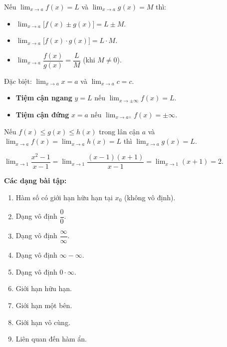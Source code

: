 \documentclass[12pt,a4paper]{article}
\begin{document}
\begin{tinhchat}[title={Quy tắc tính}]
  Nếu $\displaystyle\lim_{x \to a} f(x) = L$ và $\displaystyle\lim_{x \to a} g(x) = M$ thì:
  \begin{itemize}
    \item $\displaystyle\lim_{x \to a}\bigl[f(x) \pm g(x)\bigr] = L \pm M$.
    \item $\displaystyle\lim_{x \to a}\bigl[f(x) \cdot g(x)\bigr] = L \cdot M$.
    \item $\displaystyle\lim_{x \to a}\dfrac{f(x)}{g(x)} = \dfrac{L}{M}$ \;(khi $M \ne 0$).
  \end{itemize}
  Đặc biệt: $\displaystyle\lim_{x \to a} x = a$ và $\displaystyle\lim_{x \to a} c = c$.
\end{tinhchat}

\begin{dinhnghia}[title={Tiệm cận}]
  \begin{itemize}
    \item \textbf{Tiệm cận ngang} $y = L$ nếu $\displaystyle\lim_{x \to \pm\infty} f(x) = L$.
    \item \textbf{Tiệm cận đứng} $x = a$ nếu $\displaystyle\lim_{x \to a^{\pm}} f(x) = \pm\infty$.
  \end{itemize}
\end{dinhnghia}

\begin{dinhly}[title={Nguyên lý kẹp (cho hàm số)}]
  Nếu $f(x) \le g(x) \le h(x)$ trong lân cận $a$
  và $\displaystyle\lim_{x \to a} f(x) = \lim_{x \to a} h(x) = L$
  thì $\displaystyle\lim_{x \to a} g(x) = L$.
\end{dinhly}

\begin{vidu}
  $\displaystyle\lim_{x \to 1} \dfrac{x^2 - 1}{x - 1}
  = \lim_{x \to 1} \dfrac{(x-1)(x+1)}{x-1}
  = \lim_{x \to 1} (x+1) = 2.$
\end{vidu}

\medskip\noindent\textbf{Các dạng bài tập:}
\begin{enumerate}[label=\textbf{Dạng \arabic*:}, leftmargin=*, align=left]
  \item Hàm số có giới hạn hữu hạn tại $x_0$ (không vô định).
  \item Dạng vô định $\dfrac{0}{0}$.
  \item Dạng vô định $\dfrac{\infty}{\infty}$.
  \item Dạng vô định $\infty - \infty$.
  \item Dạng vô định $0 \cdot \infty$.
  \item Giới hạn hữu hạn.
  \item Giới hạn một bên.
  \item Giới hạn vô cùng.
  \item Liên quan đến hàm ẩn.
\end{enumerate}
\end{document}
